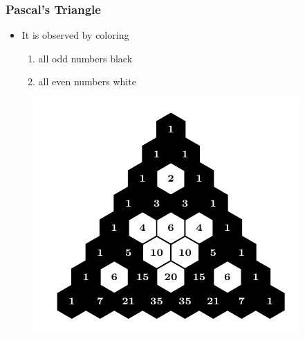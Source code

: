 \documentclass{beamer}
\begin{document}
\begin{frame}
    \frametitle{Pascal's Triangle}
    \begin{itemize}
        \item It is observed by coloring 
        \begin{enumerate}
            \item all odd numbers black
            \item all even numbers white
        \end{enumerate}
    \end{itemize}
    \begin{figure}
        \centering
        \includegraphics[scale=0.8]{Mod2,7.pdf}
    \end{figure}
    \let\thefootnote\relax{}
\end{frame}
\end{document}
